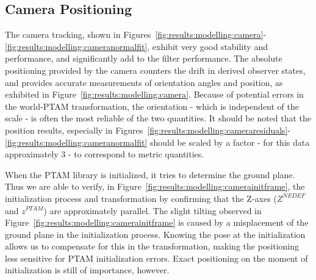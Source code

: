     \subsection{Camera Positioning}
        The camera tracking, shown in Figures~\ref{fig:results:modelling:camera}-\ref{fig:results:modelling:cameranormalfit},
        exhibit very good stability and performance, and significantly add to
        the filter performance. The absolute positioning provided by the
        camera counters the drift in derived observer states,
        and provides accurate measurements of orientation angles and position, as
        exhibited in Figure~\ref{fig:results:modelling:camera}.
        Because of potential errors in the world-PTAM transformation, the orientation - which
        is independent of the scale - is often the most reliable of the two quantities.
        It should be noted that the position results, especially in
        Figures~\ref{fig:results:modelling:cameraresiduals}-\ref{fig:results:modelling:cameranormalfit}
        should be scaled by a factor - for this data approximately $3$ - to correspond
        to metric quantities.

        When the PTAM library is initialized, it tries to determine the
        ground plane. Thus we are able to verify, in Figure~\ref{fig:results:modelling:camerainitframe}, the initialization process and transformation
        by confirming that the Z-axes ($Z^{NEDEF}$ and $z^{PTAM}$) are approximately parallel.
        The slight tilting observed in Figure~\ref{fig:results:modelling:camerainitframe}
        is caused by a misplacement of the ground plane in the initialization process.
        Knowing the pose at the initialization allows us to compensate for this in the
        transformation, making the positioning less sensitive for PTAM initialization errors.
        Exact positioning on the moment of initialization is still of importance, however.

